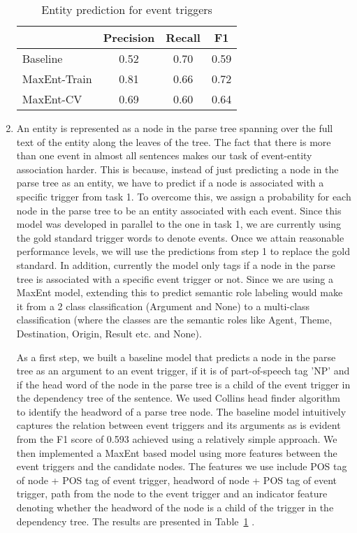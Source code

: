 \begin{enumerate}
\begin{table}
\centering
\begin{tabular}{|l||c|c|c|} \hline
&\textbf{Precision} & \textbf{Recall} & \textbf{F1} \\ \hline
\hline
Baseline&0.52&0.70&0.59\\
MaxEnt-Train&0.81&0.66&0.72\\
MaxEnt-CV&0.69&0.60&0.64\\
\hline
\end{tabular}
\caption{Entity prediction for event triggers}
\label{table:entityprediction}
\end{table}

\item {} An entity is represented as a node in the parse tree spanning over the full text of the entity along the leaves of the tree. The fact that there is more than one event in almost all sentences makes our task of event-entity association harder. This is because, instead of just predicting a node in the parse tree as an entity, we have to predict if a node is associated with a specific trigger from task 1. To overcome this, we assign a probability for each node in the parse tree to be an entity associated with each event. Since this model was developed in parallel to the one in task 1, we are currently using the gold standard trigger words to denote events. Once we attain reasonable performance levels, we will use the predictions from step 1 to replace the gold standard. In addition, currently the model only tags if a node in the parse tree is associated with a specific event trigger or not. Since we are using a MaxEnt model, extending this to predict semantic role labeling would make it from a 2 class classification (Argument and None) to a multi-class classification (where the classes are the semantic roles like Agent, Theme, Destination, Origin, Result etc. and None).

As a first step, we built a baseline model that predicts a node in the parse tree as an argument to an event trigger, if it is of part-of-speech tag 'NP' and if the head word of the node in the parse tree is a child of the event trigger in the dependency tree of the sentence. We used Collins head finder algorithm to identify the headword of a parse tree node. The baseline model intuitively captures the relation between event triggers and its arguments as is evident from the F1 score of 0.593 achieved using a relatively simple approach. We then implemented a MaxEnt based model using more features between the event triggers and the candidate nodes. The features we use include POS tag of node + POS tag of event trigger, headword of node + POS tag of event trigger, path from the node to the event trigger and an indicator feature denoting whether the headword of the node is a child of the trigger in the dependency tree. The results are presented in Table~\ref{table:entityprediction} .


\end{enumerate}

